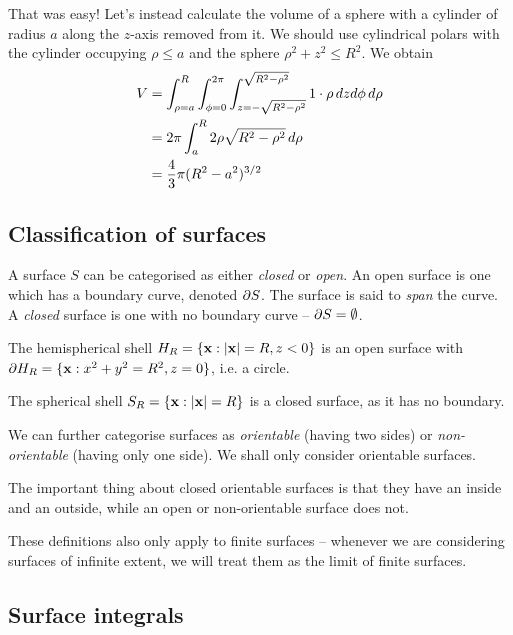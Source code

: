 \documentclass{../../template/note}
\begin{document}
    \begin{example*}
        That was easy! Let's instead calculate the volume of a sphere with a cylinder of radius \(a\) along the \(z\)-axis removed from it. We should use cylindrical polars with the cylinder occupying \(\rho \leq a\) and the sphere \(\rho^2 + z^2 \leq R^2\). We obtain
        \begin{align*}
            V &= \int_{\rho=a}^R \int_{\phi=0}^{2\pi} \int_{z=-\sqrt{R^2-\rho^2}}^{\sqrt{R^2-\rho^2}} 1 \cdot \rho \,d{z} d\phi \, d\rho \\
            &= 2\pi \int_a^R 2\rho \sqrt{R^2-\rho^2} \,d{\rho} \\
            &= \frac 4 3 \pi (R^2-a^2)^{3/2}
        \end{align*}
    \end{example*}
    
    \subsection{Classification of surfaces}

    A surface \(S\) can be categorised as either \emph{closed} or \emph{open}. An open surface is one which has a boundary curve, denoted \(\partial S\). The surface is said to \emph{span} the curve. A \emph{closed} surface is one with no boundary curve -- \(\partial S = \emptyset\).

    \begin{example*}
        The hemispherical shell \(H_R = \{\V x: |\V x| = R, z < 0\}\) is an open surface with \(\pr H_R = \{\V x : x^2 + y^2 = R^2, z = 0\}\), i.e. a circle.

        The spherical shell \(S_R = \{\V x: |\V x| = R\}\) is a closed surface, as it has no boundary.
    \end{example*}
    
    We can further categorise surfaces as \emph{orientable} (having two sides) or \emph{non-orientable} (having only one side). We shall only consider orientable surfaces.
    
    The important thing about closed orientable surfaces is that they have an inside and an outside, while an open or non-orientable surface does not.

    These definitions also only apply to finite surfaces -- whenever we are considering surfaces of infinite extent, we will treat them as the limit of finite surfaces.
    
    \subsection{Surface integrals}
\end{document}
